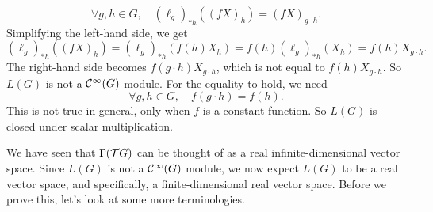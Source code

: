 \begin{equation*}
    \forall g, h \in G, \quad (\ell_g)_{* h}((f X)_h) = (f X)_{g \cdot h}.
\end{equation*}
Simplifying the left-hand side, we get
\begin{equation*}
    (\ell_g)_{* h}((f X)_h) = (\ell_g)_{* h}(f(h) X_h) = f(h) (\ell_g)_{* h}(X_h) = f(h) X_{g \cdot h}.
\end{equation*}
The right-hand side becomes \(f(g \cdot h) X_{g \cdot h}\), which is not equal to \(f(h) X_{g \cdot h}\). So \(L(G)\) is not a \(\mathcal C^\infty(G)\) module. For the equality to hold, we need
\begin{equation*}
    \forall g, h \in G, \quad f(g \cdot h) = f(h).
\end{equation*}
This is not true in general, only when \(f\) is a constant function. So \(L(G)\) is closed under scalar multiplication.

We have seen that \(\Gamma(\mathcal T G)\) can be thought of as a real infinite-dimensional vector space. Since \(L(G)\) is not a \(\mathcal C^\infty(G)\) module, we now expect \(L(G)\) to be a real vector space, and specifically, a finite-dimensional real vector space. Before we prove this, let's look at some more terminologies.

